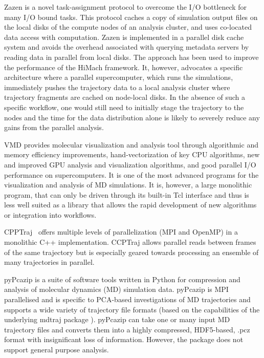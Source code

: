 Zazen \cite{Zazen} is a novel task-assignment protocol to overcome the I/O bottleneck for many I/O bound tasks. This protocol caches a copy of simulation output files on the local disks of the compute nodes of an analysis cluster, and uses co-located data access with computation. 
Zazen is implemented in a parallel disk cache system and avoids the overhead associated with querying metadata servers by reading data in parallel from local disks.
The approach has been used to improve the performance of the HiMach \cite{himach-2008} framework.
It, however, advocates a specific architecture where a parallel supercomputer, which runs the simulations, immediately pushes the trajectory data to a local analysis cluster where trajectory fragments are cached on node-local disks.
In the absence of such a specific  workflow, one would still need to initially stage the trajectory to the nodes and the time for the data distribution alone is likely to severely reduce any gains from the parallel analysis.

VMD \cite{Hum96, VMD2013} provides molecular visualization and analysis tool through algorithmic and memory efficiency improvements, hand-vectorization of key CPU algorithms, new and improved GPU analysis and visualization algorithms, and good parallel I/O performance on supercomputers. It is one of the most advanced programs for the visualization and analysis of MD simulations. It is, however, a large monolithic program, that can only be driven through its built-in Tcl interface and thus is less well suited as a library that allows the rapid development of new algorithms or integration into workflows.

CPPTraj~\cite{cpptraj-2013} offers multiple levels of parallelization (MPI and OpenMP) in a monolithic C++ implementation.
CCPTraj allows parallel reads between frames of the same trajectory but is especially geared towards processing an ensemble of many trajectories in parallel.

pyPcazip \cite{pyPcazip} is a suite of software tools written in Python for compression and analysis of molecular dynamics (MD) simulation data. 
pyPcazip is MPI parallelised and is specific to PCA-based investigations of MD trajectories and supports a wide variety of trajectory file formats (based on the capabilities of the underlying mdtraj package \cite{mdtraj-2015}).
pyPcazip can take one or many input MD trajectory files and converts them into a highly compressed, HDF5-based, .pcz format with insignificant loss of information.
However, the package does not support general purpose analysis.

